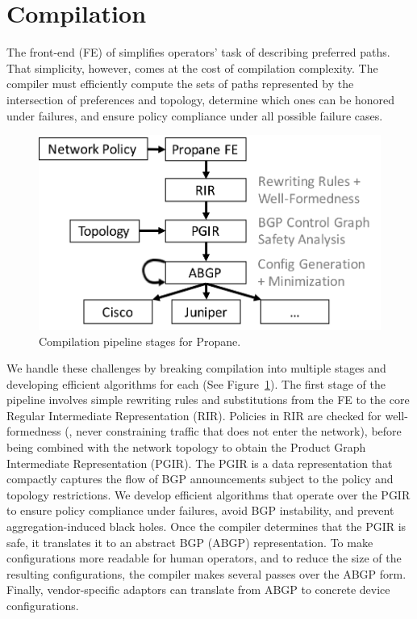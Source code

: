 \section{Compilation}
\label{sec:compilation}

The front-end (FE) of \sysname simplifies operators' task of describing preferred paths. That simplicity, however, comes at the cost of compilation complexity. The compiler must efficiently compute the sets of paths represented by the intersection of preferences and topology, determine which ones can be honored under failures, and ensure policy compliance under all possible failure cases.

\begin{figure}[t!]
\centering
\includegraphics[width=.75\columnwidth]{figures/pipeline}
\caption{Compilation pipeline stages for Propane.}
\label{fig:pipeline}
\end{figure}

We handle these challenges by breaking compilation into multiple stages and developing efficient algorithms for each (See Figure~\ref{fig:pipeline}). The first stage of the pipeline involves simple rewriting rules and substitutions from the FE to the core Regular Intermediate Representation (RIR). Policies in RIR are checked for well-formedness (\EG, never constraining traffic that does not enter the network), before being combined with the network topology to obtain the Product Graph Intermediate Representation (PGIR). The PGIR is a data representation that compactly captures the flow of BGP announcements subject to the policy and topology restrictions. We develop efficient algorithms that operate over the PGIR to ensure policy compliance under failures, avoid BGP instability, and prevent aggregation-induced black holes. Once the compiler determines that the PGIR is safe, it translates it to an abstract BGP (ABGP) representation. To make configurations more readable for human operators, and to reduce the size of the resulting configurations, the \sysname compiler makes several passes over the ABGP form. Finally, vendor-specific adaptors can translate from ABGP to concrete device configurations.

